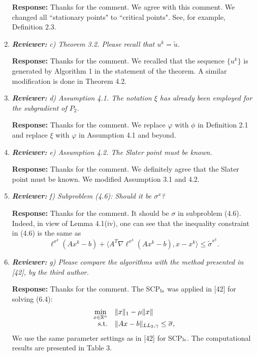 \documentclass{article}
\def\R{\mathbb{R}}
\begin{document}
\begin{enumerate}
	\textbf{Response:} Thanks for the comment. We agree with this comment. We changed all ``stationary points" to ``critical points". See, for example, Definition 2.3.
	
	\item  \textit{\textbf{Reviewer:}} \textit{ c) Theorem 3.2. Please recall that $u^k = \tilde u$.}
	
	\textbf{Response:} Thanks for the comment. We recalled that the sequence $\{u^k\}$ is generated by Algorithm 1 in the statement of the theorem. A similar modification is done in Theorem 4.2.

	\item \textit{\textbf{Reviewer:}} \textit{ d) Assumption 4.1. The notation $\xi$ has already been employed for the subgradient of $P_2$.}

    \textbf{Response:} Thanks for the comment. We replace $\varphi$ with $\phi$ in Definition 2.1 and replace $\xi$ with $\varphi$ in Assumption 4.1 and beyond.

	\item \textit{\textbf{Reviewer:}} \textit{ e) Assumption 4.2. The Slater point must be known.}

    \textbf{Response:} Thanks for the comment. We definitely agree that the Slater point must be known. We modified Assumption 3.1 and 4.2.

	\item \textit{\textbf{Reviewer:}} \textit{ f) Subproblem (4.6): Should it be $\sigma^x$?}

    \textbf{Response:} Thanks for the comment. It should be $\sigma$ in subproblem (4.6). Indeed, in view of Lemma 4.1(iv), one can see that the inequality constraint in (4.6) is the same as
    \[
    \ell^{x^k}(Ax^k - b) + \langle A^T\nabla \ell^{x^k}(Ax^k - b),x-x^k\rangle \le \tilde \sigma^{x^k}.
    \]

	\item \textit{\textbf{Reviewer:}} \textit{ g) Please compare the algorithms with the method presented in [42], by the third author.}

    \textbf{Response:} Thanks for the comment. The SCP$_{\rm ls}$ was applied in [42] for solving (6.4):
    \begin{equation}\label{pr1}
       \begin{array}{rl}
        \min\limits_{x\in\R^n} & \|x\|_1 - \mu\|x\| \\
        {\rm s.t.} & \|Ax - b\|_{LL_2,\gamma}\leq \overline{\sigma},
       \end{array}
     \end{equation}
    We use the same parameter settings as in [42] for SCP$_{\rm ls}$. The computational results are presented in Table 3.


\end{enumerate}
\end{document}
